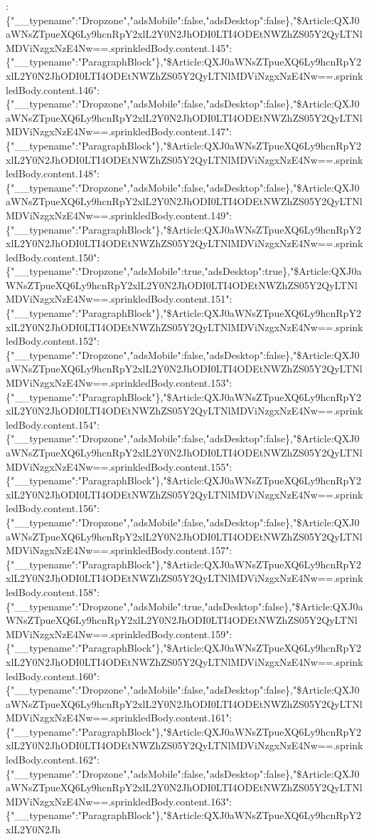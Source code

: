:\{"\_\_typename":"Dropzone","adsMobile":false,"adsDesktop":false\},"\$Article:QXJ0aWNsZTpueXQ6Ly9hcnRpY2xlL2Y0N2JhODI0LTI4ODEtNWZhZS05Y2QyLTNlMDViNzgxNzE4Nw==.sprinkledBody.content.145":\{"\_\_typename":"ParagraphBlock"\},"\$Article:QXJ0aWNsZTpueXQ6Ly9hcnRpY2xlL2Y0N2JhODI0LTI4ODEtNWZhZS05Y2QyLTNlMDViNzgxNzE4Nw==.sprinkledBody.content.146":\{"\_\_typename":"Dropzone","adsMobile":false,"adsDesktop":false\},"\$Article:QXJ0aWNsZTpueXQ6Ly9hcnRpY2xlL2Y0N2JhODI0LTI4ODEtNWZhZS05Y2QyLTNlMDViNzgxNzE4Nw==.sprinkledBody.content.147":\{"\_\_typename":"ParagraphBlock"\},"\$Article:QXJ0aWNsZTpueXQ6Ly9hcnRpY2xlL2Y0N2JhODI0LTI4ODEtNWZhZS05Y2QyLTNlMDViNzgxNzE4Nw==.sprinkledBody.content.148":\{"\_\_typename":"Dropzone","adsMobile":false,"adsDesktop":false\},"\$Article:QXJ0aWNsZTpueXQ6Ly9hcnRpY2xlL2Y0N2JhODI0LTI4ODEtNWZhZS05Y2QyLTNlMDViNzgxNzE4Nw==.sprinkledBody.content.149":\{"\_\_typename":"ParagraphBlock"\},"\$Article:QXJ0aWNsZTpueXQ6Ly9hcnRpY2xlL2Y0N2JhODI0LTI4ODEtNWZhZS05Y2QyLTNlMDViNzgxNzE4Nw==.sprinkledBody.content.150":\{"\_\_typename":"Dropzone","adsMobile":true,"adsDesktop":true\},"\$Article:QXJ0aWNsZTpueXQ6Ly9hcnRpY2xlL2Y0N2JhODI0LTI4ODEtNWZhZS05Y2QyLTNlMDViNzgxNzE4Nw==.sprinkledBody.content.151":\{"\_\_typename":"ParagraphBlock"\},"\$Article:QXJ0aWNsZTpueXQ6Ly9hcnRpY2xlL2Y0N2JhODI0LTI4ODEtNWZhZS05Y2QyLTNlMDViNzgxNzE4Nw==.sprinkledBody.content.152":\{"\_\_typename":"Dropzone","adsMobile":false,"adsDesktop":false\},"\$Article:QXJ0aWNsZTpueXQ6Ly9hcnRpY2xlL2Y0N2JhODI0LTI4ODEtNWZhZS05Y2QyLTNlMDViNzgxNzE4Nw==.sprinkledBody.content.153":\{"\_\_typename":"ParagraphBlock"\},"\$Article:QXJ0aWNsZTpueXQ6Ly9hcnRpY2xlL2Y0N2JhODI0LTI4ODEtNWZhZS05Y2QyLTNlMDViNzgxNzE4Nw==.sprinkledBody.content.154":\{"\_\_typename":"Dropzone","adsMobile":false,"adsDesktop":false\},"\$Article:QXJ0aWNsZTpueXQ6Ly9hcnRpY2xlL2Y0N2JhODI0LTI4ODEtNWZhZS05Y2QyLTNlMDViNzgxNzE4Nw==.sprinkledBody.content.155":\{"\_\_typename":"ParagraphBlock"\},"\$Article:QXJ0aWNsZTpueXQ6Ly9hcnRpY2xlL2Y0N2JhODI0LTI4ODEtNWZhZS05Y2QyLTNlMDViNzgxNzE4Nw==.sprinkledBody.content.156":\{"\_\_typename":"Dropzone","adsMobile":false,"adsDesktop":false\},"\$Article:QXJ0aWNsZTpueXQ6Ly9hcnRpY2xlL2Y0N2JhODI0LTI4ODEtNWZhZS05Y2QyLTNlMDViNzgxNzE4Nw==.sprinkledBody.content.157":\{"\_\_typename":"ParagraphBlock"\},"\$Article:QXJ0aWNsZTpueXQ6Ly9hcnRpY2xlL2Y0N2JhODI0LTI4ODEtNWZhZS05Y2QyLTNlMDViNzgxNzE4Nw==.sprinkledBody.content.158":\{"\_\_typename":"Dropzone","adsMobile":true,"adsDesktop":false\},"\$Article:QXJ0aWNsZTpueXQ6Ly9hcnRpY2xlL2Y0N2JhODI0LTI4ODEtNWZhZS05Y2QyLTNlMDViNzgxNzE4Nw==.sprinkledBody.content.159":\{"\_\_typename":"ParagraphBlock"\},"\$Article:QXJ0aWNsZTpueXQ6Ly9hcnRpY2xlL2Y0N2JhODI0LTI4ODEtNWZhZS05Y2QyLTNlMDViNzgxNzE4Nw==.sprinkledBody.content.160":\{"\_\_typename":"Dropzone","adsMobile":false,"adsDesktop":false\},"\$Article:QXJ0aWNsZTpueXQ6Ly9hcnRpY2xlL2Y0N2JhODI0LTI4ODEtNWZhZS05Y2QyLTNlMDViNzgxNzE4Nw==.sprinkledBody.content.161":\{"\_\_typename":"ParagraphBlock"\},"\$Article:QXJ0aWNsZTpueXQ6Ly9hcnRpY2xlL2Y0N2JhODI0LTI4ODEtNWZhZS05Y2QyLTNlMDViNzgxNzE4Nw==.sprinkledBody.content.162":\{"\_\_typename":"Dropzone","adsMobile":false,"adsDesktop":false\},"\$Article:QXJ0aWNsZTpueXQ6Ly9hcnRpY2xlL2Y0N2JhODI0LTI4ODEtNWZhZS05Y2QyLTNlMDViNzgxNzE4Nw==.sprinkledBody.content.163":\{"\_\_typename":"ParagraphBlock"\},"\$Article:QXJ0aWNsZTpueXQ6Ly9hcnRpY2xlL2Y0N2Jh